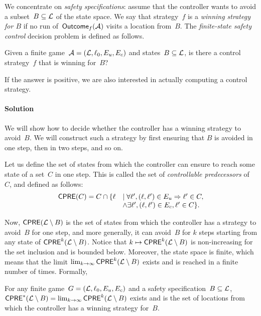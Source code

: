 \documentclass{article}
\begin{document}
We concentrate on \emph{safety specifications}: assume that the controller wants to avoid a
subset~$B \subseteq \mathcal{L}$ of the state space. We say that strategy~$f$
is a \emph{winning strategy for $B$} if no run of~$\textsf{Outcome}_f(\mathcal{A})$ visits a
location from~$B$.
The \emph{finite-state safety control} decision problem is defined as follows.
\begin{problem}
  Given a finite game~$\mathcal{A}=(\mathcal{L},\ell_0,E_u,E_c)$ and states~$B \subseteq
  \mathcal{L}$, is there a control strategy~$f$ that is winning for~$B$?
\end{problem}

If the answer is positive, we are also interested in actually
computing a control strategy.


\paragraph{Solution}
We will show how to decide whether the controller has a winning strategy to
avoid~$B$. We will construct such a strategy by first ensuring that $B$ is
avoided in one step, then in two steps, and so on.

Let us define the set of states from which the
controller can ensure to reach some state of a set~$C$ in one step. This is called the set of
\emph{controllable predecessors} of~$C$, and defined as follows:
\[
  \begin{array}{ll}
  \textrm{\sf CPRE}(C) = C \cap \{ \ell &\mid \forall \ell', (\ell,\ell') \in E_u \Rightarrow \ell'
  \in C,\\& \land \exists \ell', (\ell,\ell') \in E_c, \ell' \in C\}.
\end{array}
\]

Now, $\textrm{\sf CPRE}(\mathcal{L} \setminus B)$ is the set of states from which the controller
has a strategy to avoid~$B$ for one step, and more generally, it can avoid~$B$
for $k$ steps starting from any state of $\textrm{\sf CPRE}^k(\mathcal{L}\setminus B)$.
Notice that $k \mapsto \textrm{\sf CPRE}^k(\mathcal{L}\setminus B)$ is non-increasing for the set
inclusion and is bounded below. Moreover, the state space is finite, which means
that the limit $\lim_{k\rightarrow \infty} \textrm{\sf CPRE}^k(\mathcal{L}\setminus B)$ exists and
is reached in a finite number of times. Formally,

\begin{theorem}
  For any finite game~$G = (\mathcal{L}, \ell_0, E_u, E_c)$ and a safety
  specification~$B\subseteq \mathcal{L}$, $\textrm{\sf CPRE}^*(\mathcal{L}\setminus B) =
  \lim_{k\rightarrow \infty}\textrm{\sf CPRE}^k(\mathcal{L}\setminus B)$ exists and is the set of
  locations from which the controller has a winning strategy for~$B$.
\end{theorem}
\end{document}
